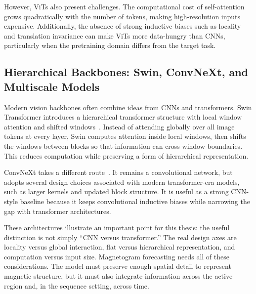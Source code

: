 However, ViTs also present challenges. The computational cost of self-attention grows quadratically with the number of tokens, making high-resolution inputs expensive. Additionally, the absence of strong inductive biases such as locality and translation invariance can make ViTs more data-hungry than CNNs, particularly when the pretraining domain differs from the target task.


\subsection{Hierarchical Backbones: Swin, ConvNeXt, and Multiscale Models}

Modern vision backbones often combine ideas from CNNs and transformers. Swin Transformer introduces a hierarchical transformer structure with local window attention and shifted windows~\cite{ref_swin}. Instead of attending globally over all image tokens at every layer, Swin computes attention inside local windows, then shifts the windows between blocks so that information can cross window boundaries. This reduces computation while preserving a form of hierarchical representation.

ConvNeXt takes a different route~\cite{ref_convnext}. It remains a convolutional network, but adopts several design choices associated with modern transformer-era models, such as larger kernels and updated block structure. It is useful as a strong CNN-style baseline because it keeps convolutional inductive biases while narrowing the gap with transformer architectures.

These architectures illustrate an important point for this thesis: the useful distinction is not simply ``CNN versus transformer.'' The real design axes are locality versus global interaction, flat versus hierarchical representation, and computation versus input size. Magnetogram forecasting needs all of these considerations. The model must preserve enough spatial detail to represent magnetic structure, but it must also integrate information across the active region and, in the sequence setting, across time.


